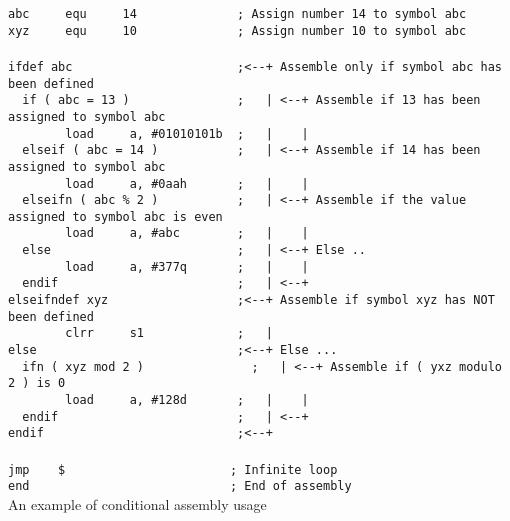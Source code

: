     \begin{code}[h!]
        \mysmallfont{}
        \verb'abc     equ     14              ; Assign number 14 to symbol abc'\\
        \verb'xyz     equ     10              ; Assign number 10 to symbol abc'\\
        \verb''\\
        \verb'ifdef abc                       ;<--+ Assemble only if symbol abc has been defined'\\
        \verb'  if ( abc = 13 )               ;   | <--+ Assemble if 13 has been assigned to symbol abc'\\
        \verb'        load     a, #01010101b  ;   |    |'\\
        \verb'  elseif ( abc = 14 )           ;   | <--+ Assemble if 14 has been assigned to symbol abc'\\
        \verb'        load     a, #0aah       ;   |    |'\\
        \verb'  elseifn ( abc % 2 )           ;   | <--+ Assemble if the value assigned to symbol abc is even'\\
        \verb'        load     a, #abc        ;   |    |'\\
        \verb'  else                          ;   | <--+ Else ..'\\
        \verb'        load     a, #377q       ;   |    |'\\
        \verb'  endif                         ;   | <--+'\\
        \verb'elseifndef xyz                  ;<--+ Assemble if symbol xyz has NOT been defined'\\
        \verb'        clrr     s1             ;   |'\\
        \verb'else                            ;<--+ Else ...'\\
        \verb'  ifn ( xyz mod 2 )               ;   | <--+ Assemble if ( yxz modulo 2 ) is 0'\\
        \verb'        load     a, #128d       ;   |    |'\\
        \verb'  endif                         ;   | <--+'\\
        \verb'endif                           ;<--+'\\
        \verb''\\
        \verb'jmp    $                       ; Infinite loop'\\
        \verb'end                            ; End of assembly'\\
        \caption{An example of conditional assembly usage}
    \end{code}

